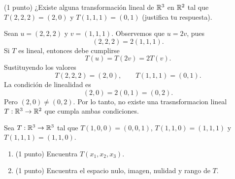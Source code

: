 \documentclass[12pt,a4paper]{article}
\begin{document}
    \begin{mdframed}[style=mdpinkbox,frametitle={Ejercicio 2}]
        (1 punto) ¿Existe alguna transformación lineal de $\mathbb{R}^{3}$ en $\mathbb{R}^{2}$ tal que
        $T(2,2,2)=(2,0)$ y $T(1,1,1)=(0,1)$ (justifica tu respuesta).
    \end{mdframed}

    \begin{solucion}
        Sean $u=(2,2,2)$ y $v=(1,1,1)$. Observemos que $u=2v$, pues
        \begin{equation*}
            (2,2,2)=2(1,1,1).
        \end{equation*}
        Si $T$ es lineal, entonces debe cumplirse
        \begin{equation*}
            T(u)=T(2v)=2T(v).
        \end{equation*}
        Sustituyendo los valores
        \begin{equation*}
            T(2,2,2)=(2,0),\qquad T(1,1,1)=(0,1).
        \end{equation*}
        La condición de linealidad es
        \begin{equation*}
            (2,0)=2(0,1)=(0,2).
        \end{equation*}
        Pero $(2,0)\neq(0,2)$. Por lo tanto, no existe una trasnsformacion lineal
        $T:\mathbb{R}^{3}\to\mathbb{R}^{2}$ que cumpla ambas condiciones.
    \end{solucion}

    \begin{mdframed}[style=mdpinkbox,frametitle={Ejercicio 3}]
        Sea $T:\mathbb{R}^{3}\to\mathbb{R}^{3}$ tal que $T(1,0,0)=(0,0,1)$, $T(1,1,0)=(1,1,1)$ y $T(1,1,1)=(1,1,0)$.
        \begin{enumerate}
            \item[(a)] (1 punto) Encuentra $T(x_{1},x_{2},x_{3})$.
            \item[(b)] (1 punto) Encuentra el espacio nulo, imagen, nulidad y rango de $T$. 
        \end{enumerate}
    \end{mdframed}
\end{document}
